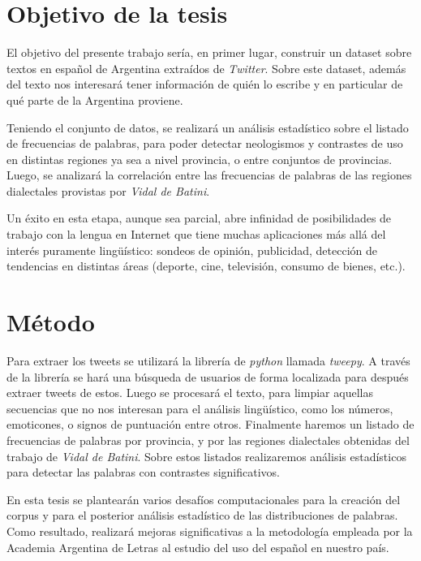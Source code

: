 \documentclass[a4paper,11pt]{article}
\begin{document}
\section*{Objetivo de la tesis}

El objetivo del presente trabajo sería, en primer lugar, construir un dataset\cite{CORPLING} sobre textos en español de Argentina extraídos de \emph{Twitter}\cite{KILG2003}. 
Sobre este dataset, además del texto nos interesará tener información de quién lo escribe y en particular de qué parte de la Argentina proviene.

Teniendo el conjunto de datos, se realizará un análisis estadístico sobre el listado de frecuencias de palabras, para poder detectar neologismos y contrastes de uso en distintas regiones ya sea a nivel provincia, o entre conjuntos de provincias. Luego, se analizará la correlación entre las frecuencias de palabras de las regiones dialectales provistas por \emph{Vidal de Batini}\cite{VIDAL1964}.

Un éxito en esta etapa, aunque sea parcial, abre infinidad de posibilidades de trabajo con la lengua en Internet que tiene muchas aplicaciones más allá del interés puramente lingüístico: sondeos de opinión, publicidad, detección de tendencias en distintas áreas (deporte, cine, televisión, consumo de bienes, etc.).   


\section*{Método}

Para extraer los tweets se utilizará la librería de \textit{python} llamada \textit{tweepy}.
A través de la librería se hará una búsqueda de usuarios de forma localizada para después extraer tweets de estos.
Luego se procesará el texto, para limpiar aquellas secuencias que no nos interesan para el análisis lingüístico,
como los números, emoticones, o signos de puntuación entre otros.
Finalmente haremos un listado de frecuencias de palabras\cite{BAAYEN} por provincia,
y por las regiones dialectales obtenidas del trabajo de  \emph{Vidal de Batini}. Sobre estos listados realizaremos análisis estadísticos para detectar las palabras con contrastes significativos. 

En esta tesis se plantearán varios desafíos computacionales para la
creación del corpus y para el posterior análisis estadístico de las
distribuciones de palabras. Como resultado, realizará mejoras significativas
a la metodología empleada por la Academia Argentina de Letras al
estudio del uso del español en nuestro país.
\end{document}
